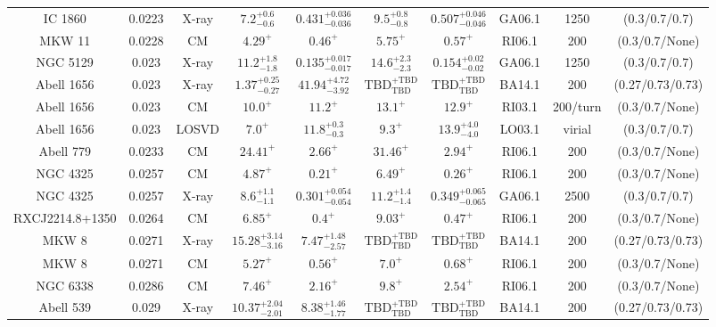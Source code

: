 \begin{table}
\begin{tabular}{cccccccccc}
IC 1860 & 0.0223 & X-ray & ${7.2}^{+0.6}_{-0.6}$ & ${0.431}^{+0.036}_{-0.036}$ & ${9.5}^{+0.8}_{-0.8}$ & ${0.507}^{+0.046}_{-0.046}$ & GA06.1 & 1250 & (0.3/0.7/0.7) \\
MKW 11 & 0.0228 & CM & ${4.29}^{+}_{}$ & ${0.46}^{+}_{}$ & ${5.75}^{+}_{}$ & ${0.57}^{+}_{}$ & RI06.1 & 200 & (0.3/0.7/None) \\
NGC 5129 & 0.023 & X-ray & ${11.2}^{+1.8}_{-1.8}$ & ${0.135}^{+0.017}_{-0.017}$ & ${14.6}^{+2.3}_{-2.3}$ & ${0.154}^{+0.02}_{-0.02}$ & GA06.1 & 1250 & (0.3/0.7/0.7) \\
Abell 1656 & 0.023 & X-ray & ${1.37}^{+0.25}_{-0.27}$ & ${41.94}^{+4.72}_{-3.92}$ & ${\mathrm{TBD}}^{+\mathrm{TBD}}_{\mathrm{TBD}}$ & ${\mathrm{TBD}}^{+\mathrm{TBD}}_{\mathrm{TBD}}$ & BA14.1 & 200 & (0.27/0.73/0.73) \\
Abell 1656 & 0.023 & CM & ${10.0}^{+}_{}$ & ${11.2}^{+}_{}$ & ${13.1}^{+}_{}$ & ${12.9}^{+}_{}$ & RI03.1 & 200/turn & (0.3/0.7/None) \\
Abell 1656 & 0.023 & LOSVD & ${7.0}^{+}_{}$ & ${11.8}^{+0.3}_{-0.3}$ & ${9.3}^{+}_{}$ & ${13.9}^{+4.0}_{-4.0}$ & LO03.1 & virial & (0.3/0.7/0.7) \\
Abell 779 & 0.0233 & CM & ${24.41}^{+}_{}$ & ${2.66}^{+}_{}$ & ${31.46}^{+}_{}$ & ${2.94}^{+}_{}$ & RI06.1 & 200 & (0.3/0.7/None) \\
NGC 4325 & 0.0257 & CM & ${4.87}^{+}_{}$ & ${0.21}^{+}_{}$ & ${6.49}^{+}_{}$ & ${0.26}^{+}_{}$ & RI06.1 & 200 & (0.3/0.7/None) \\
NGC 4325 & 0.0257 & X-ray & ${8.6}^{+1.1}_{-1.1}$ & ${0.301}^{+0.054}_{-0.054}$ & ${11.2}^{+1.4}_{-1.4}$ & ${0.349}^{+0.065}_{-0.065}$ & GA06.1 & 2500 & (0.3/0.7/0.7) \\
RXCJ2214.8+1350 & 0.0264 & CM & ${6.85}^{+}_{}$ & ${0.4}^{+}_{}$ & ${9.03}^{+}_{}$ & ${0.47}^{+}_{}$ & RI06.1 & 200 & (0.3/0.7/None) \\
MKW 8 & 0.0271 & X-ray & ${15.28}^{+3.14}_{-3.16}$ & ${7.47}^{+1.48}_{-2.57}$ & ${\mathrm{TBD}}^{+\mathrm{TBD}}_{\mathrm{TBD}}$ & ${\mathrm{TBD}}^{+\mathrm{TBD}}_{\mathrm{TBD}}$ & BA14.1 & 200 & (0.27/0.73/0.73) \\
MKW 8 & 0.0271 & CM & ${5.27}^{+}_{}$ & ${0.56}^{+}_{}$ & ${7.0}^{+}_{}$ & ${0.68}^{+}_{}$ & RI06.1 & 200 & (0.3/0.7/None) \\
NGC 6338 & 0.0286 & CM & ${7.46}^{+}_{}$ & ${2.16}^{+}_{}$ & ${9.8}^{+}_{}$ & ${2.54}^{+}_{}$ & RI06.1 & 200 & (0.3/0.7/None) \\
Abell 539 & 0.029 & X-ray & ${10.37}^{+2.04}_{-2.01}$ & ${8.38}^{+1.46}_{-1.77}$ & ${\mathrm{TBD}}^{+\mathrm{TBD}}_{\mathrm{TBD}}$ & ${\mathrm{TBD}}^{+\mathrm{TBD}}_{\mathrm{TBD}}$ & BA14.1 & 200 & (0.27/0.73/0.73) \\

\end{tabular}
\end{table}
